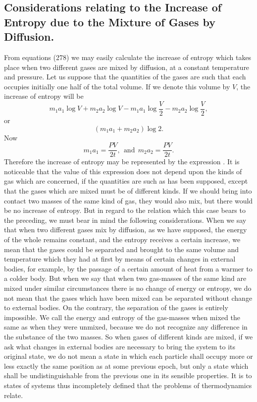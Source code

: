 \documentclass[12pt]{memoir}
\begin{document}
\subsection{Considerations relating to the Increase of Entropy due to the
Mixture of Gases by Diffusion.}

From  equations (278) we may easily calculate the increase of entropy which takes place when two different gases are mixed by diffusion, at a constant temperature and pressure. Let us suppose that the quantities of the gases are such that each occupies initially one half of the total volume. If we denote this volume by $V$, the increase of entropy will be
 $$m_1 a_1 \log V+ m_2 a_2 \log V- m_1 a_1 \log \frac{V}{2} - m_2 a_2 \log \frac{V}{2},$$
or                   $$ (m_1 a_1 +m_2 a_2) \log 2.$$
Now
$$m_1 a_1=\frac{PV}{2t}, \ \ \text{and} \ \  m_2 a_2=\frac{PV}{2t}.$$
Therefore the increase of entropy may be represented by the expression
\eqs {}  .       \label{297}\eqe
It is noticeable that the value of this expression does not depend upon the kinds of gas which are concerned, if the quantities are such as has been supposed, except that the gases which are mixed must be of different kinds. If we should bring into contact two masses of the same kind of gas, they would also mix, but there would be no increase of entropy. But in regard to the relation which this case bears to the preceding, we must bear in mind the following considerations. When we say that when two different gases mix by diffusion, as we have supposed, the energy of the whole remains constant, and the entropy receives a certain increase, we mean that the gases could be separated and brought to the same volume and temperature which they had at first by means of certain changes in external bodies, for example, by the passage of a certain amount of heat from a warmer to a colder body. But when we say that when two gas-masses of the same kind are mixed under similar circumstances there is no change of energy or entropy, we do not mean that the gases which have been mixed can be separated without change to external bodies. On the contrary, the separation of the gases is entirely impossible. We call the energy and entropy of the gas-masses when mixed the same as when they were unmixed, because we do not recognize any difference in the substance of the two masses. So when gases of different kinds are mixed, if we ask what changes in external bodies are necessary to bring the system to its original state, we do not mean a state in which each particle shall occupy more or less exactly the same position as at some previous epoch, but only a state which shall be undistinguishable from the previous one in its sensible properties. It is to states of systems thus incompletely defined that the problems of thermodynamics relate.
\end{document}

